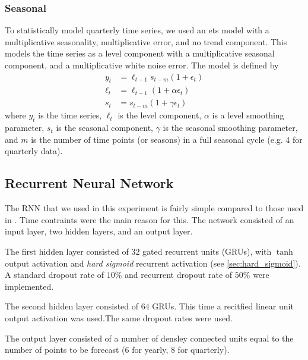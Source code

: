 \documentclass[a4paper,12pt]{article}
\theoremstyle{definition}
\begin{document}
\subsubsection{Seasonal}\label{sec:seasonal_stats_modelling}
To statistically model quarterly time series, we used an ets model with a multiplicative seasonality, multiplicative error, and no trend component. This models the time series as a level component with a multiplicative seasonal component, and a multiplicative white noise error. The model is defined by
\begin{align}
	y_t &= \ell_{t-1}s_{t-m}(1 + \epsilon_t) \label{eq:seasonal_series} \\
	\ell_t &= \ell_{t-1}(1 + \alpha \epsilon_t) \label{eq:seasonal_level} \\
	s_t &= s_{t-m}(1 + \gamma \epsilon_t) \label{eq:seasonal_season}
\end{align}
where $y_t$ is the time series, $\ell_t$ is the level component, $\alpha$ is a level smoothing parameter, $s_t$ is the seasonal component, $\gamma$ is the seasonal smoothing parameter, and $m$ is the number of time points (or seasons) in a full seasonal cycle (e.g. $4$ for quarterly data).

\subsection{Recurrent Neural Network}
The RNN that we used in this experiment is fairly simple compared to those used in \cite{smyl}. Time contraints were the main reason for this. The network consisted of an input layer, two hidden layers, and an output layer. 

The first hidden layer consisted of $32$ gated recurrent units (GRUs), with $\tanh$ output activation and \textit{hard sigmoid} recurrent activation (see \ref{sec:hard_sigmoid}). A standard dropout rate of $10\%$ and recurrent dropout rate of $50\%$ were implemented.

The second hidden layer consisted of $64$ GRUs. This time a recitfied linear unit output activation was used.The same dropout rates were used.

The output layer consisted of a number of densley connected units equal to the number of points to be forecast ($6$ for yearly, $8$ for quarterly).
\end{document}

